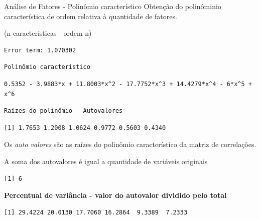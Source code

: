 \documentclass[
  ignorenonframetext,
  aspectratio=169,
]{beamer}
\begin{document}
\begin{frame}[fragile]{Análise de Fatores - Polinômio característico}
\label{anuxe1lise-de-fatores---polinuxf4mio-caracteruxedstico}
Obtenção do polinôminio característica de ordem relativa à quantidade de
fatores.

(n características - ordem n)

\begin{verbatim}
Error term: 1.070302 
\end{verbatim}

\begin{verbatim}
Polinômio característico
\end{verbatim}

\begin{verbatim}
0.5352 - 3.9883*x + 11.8003*x^2 - 17.7752*x^3 + 14.4279*x^4 - 6*x^5 + x^6 
\end{verbatim}

\begin{verbatim}
Raízes do polinômio - Autovalores
\end{verbatim}

\begin{verbatim}
[1] 1.7653 1.2008 1.0624 0.9772 0.5603 0.4340
\end{verbatim}

Os \emph{auto valores} são as raízes do polinômio característico da
matriz de correlações.

A soma dos autovalores é igual a quantidade de variáveis originais

\begin{verbatim}
[1] 6
\end{verbatim}

\textbf{Percentual de variância - valor do autovalor dividido pelo
total}

\begin{verbatim}
[1] 29.4224 20.0130 17.7060 16.2864  9.3389  7.2333
\end{verbatim}
\end{frame}
\end{document}
